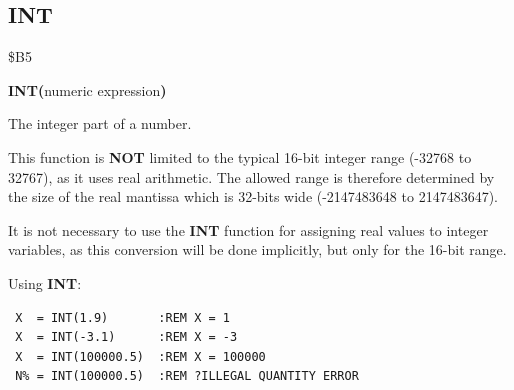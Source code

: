 
\newpage
\subsection{INT}
\begin{description}[leftmargin=2cm,style=nextline]
\item [Token:] \$B5
\item [Format:] {\bf INT(}numeric expression{\bf)}
\item [Returns:] The integer part of a number.

               This function is {\bf NOT} limited to the typical
               16-bit integer range (-32768 to 32767), as
               it uses real arithmetic. The allowed range is
               therefore determined by the size of the real
               mantissa which is 32-bits wide (-2147483648 to 2147483647).

\item [Remarks:] It is not necessary to use the {\bf INT}
               function for assigning real values to integer
               variables, as this conversion will be done
               implicitly, but only for the 16-bit range.

\item [Examples:] Using {\bf INT}:
\begin{tcolorbox}[colback=black,coltext=white]
\verbatimfont{\codefont}
\begin{verbatim}
 X  = INT(1.9)       :REM X = 1
 X  = INT(-3.1)      :REM X = -3
 X  = INT(100000.5)  :REM X = 100000
 N% = INT(100000.5)  :REM ?ILLEGAL QUANTITY ERROR
\end{verbatim}
\end{tcolorbox}
\end{description}


\newpage
